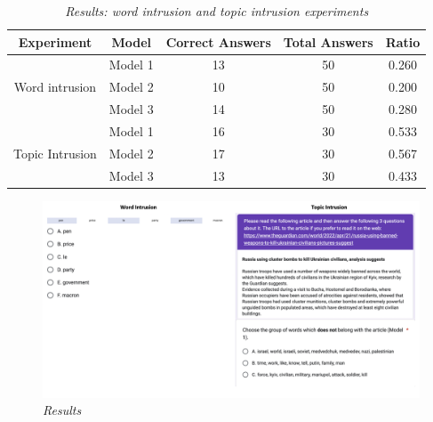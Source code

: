\documentclass[twoside,11pt,a4paper]{article}
\begin{document}
\begin{table}[h!]
\centering
\begin{tabular}{c c c c c} 
\hline
Experiment & Model & Correct Answers & Total Answers & Ratio \\ [0.5ex] 
\hline
& Model 1 & 13 & 50 & 0.260\\ 
Word intrusion & Model 2 & 10 & 50 & 0.200 \\
& Model 3 & 14 & 50 & 0.280 \\ [1ex] 
\hline
& Model 1 & 16 & 30 & 0.533 \\
Topic Intrusion & Model 2 & 17 & 30 & 0.567 \\
& Model 3 & 13 & 30 & 0.433 \\ [1ex] 
\hline
\end{tabular}
\caption{\textit{Results: word intrusion and topic intrusion experiments}}
\label{table:forms_results}
\end{table}

\begin{figure}[h]
\centering
\includegraphics[scale=0.4]{forms_results.png}
\caption{\textit{Results}}
\label{fig:forms_results}
\end{figure}
\end{document}
